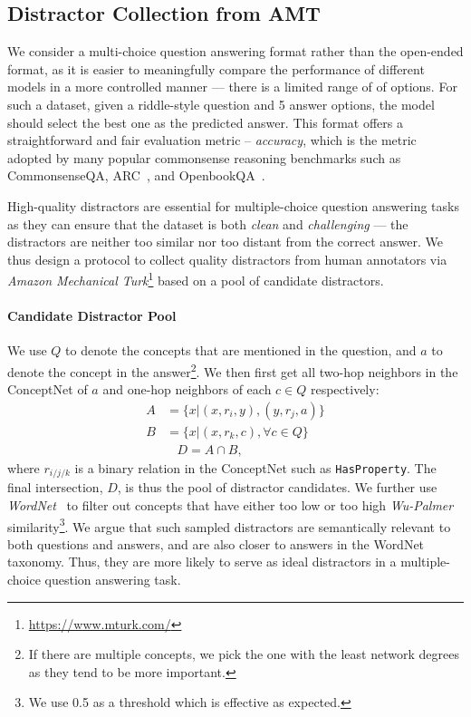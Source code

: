 \subsection{Distractor Collection from AMT}
We consider a multi-choice question answering format rather than the open-ended format, as it is easier to meaningfully compare the performance of different models in a more controlled manner --- there is a limited range of of options. For such a dataset, given a riddle-style question and 5 answer options, the model should select the best one as the predicted answer. 
This format offers a straightforward and fair evaluation metric -- \textit{accuracy}, which is the metric adopted by  many popular commonsense reasoning benchmarks such as CommonsenseQA, ARC~\cite{Clark2018ThinkYH}, and OpenbookQA~\cite{Mihaylov2018CanAS}. 

High-quality distractors are essential for multiple-choice question answering tasks as they can ensure that the dataset is both \textit{clean} and \textit{challenging} --- the distractors are neither too similar nor too distant from the correct answer.
We thus design a protocol to collect quality distractors from human annotators via \textit{Amazon Mechanical Turk}\footnote{\url{https://www.mturk.com/}} based on a pool of candidate distractors.


\paragraph{Candidate Distractor Pool}
We use $Q$ to denote the concepts that are mentioned in the question, and $a$ to denote the concept in the answer\footnote{If there are multiple concepts, we pick the one with the least network degrees 
as they tend to be more important.}.
We then first get all two-hop neighbors in the ConceptNet of $a$ and one-hop neighbors of each $c \in Q$ respectively:
\begin{align*}
    A &= \{x | (x, r_i, y), (y, r_j, a) \} \\
    B &= \{x | (x, r_k, c), \forall c\in Q \} \\
   &~~~~D = A \cap B ,
\end{align*}
where $r_{i/j/k}$ is a binary relation in the ConceptNet such as \texttt{HasProperty}.
The final intersection, $D$, is thus the pool of distractor candidates.
We further use \textit{WordNet}~\cite{miller1995wordnet} to filter out concepts that have either too low or too high \textit{Wu-Palmer} similarity\footnote{We use 0.5 as a threshold which is effective as expected.}.
We argue that such sampled distractors are semantically relevant to both questions and answers, and are also closer to answers in the WordNet taxonomy.
Thus, they are more likely to serve as ideal distractors in a multiple-choice question answering task. 

